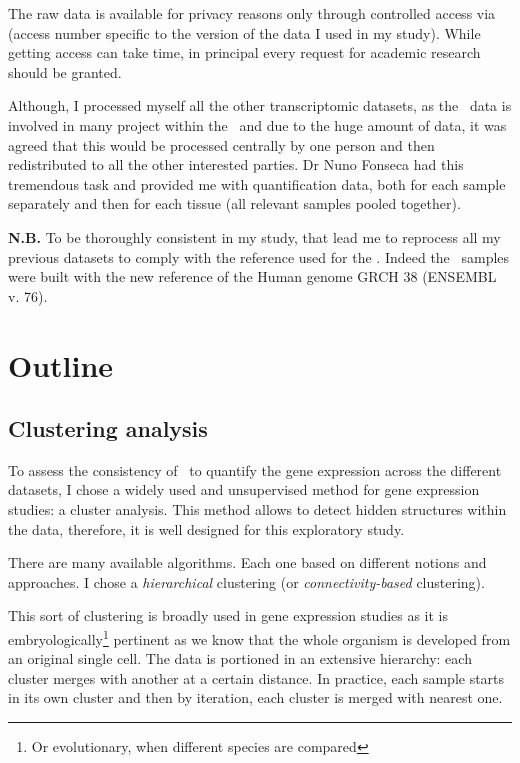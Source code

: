 The raw data is available for privacy reasons only through controlled access via
 (access number specific to the version of the data I used
in my study). While getting access can take time, in principal every request for
academic research should be granted.

Although, I processed myself all the other transcriptomic datasets, as the \Gtex\
data is involved in many project within the \EBI\ and due to the huge amount of data,
it was agreed that this would be processed centrally by one person and then
redistributed to all the other interested parties. Dr Nuno Fonseca had this
tremendous task and provided me with quantification data, both for each sample
separately and then for each tissue (all relevant samples pooled together).

\textbf{N.B. }To be thoroughly consistent in my study, that lead me to reprocess all my
previous datasets to comply with the reference used for the \Gtex. Indeed the
\Gtex\ samples were built with the new reference of the Human genome GRCH 38
(ENSEMBL v. 76).

\section{Outline}

\subsection{Clustering analysis}

To assess the consistency of \Rnaseq\ to quantify the gene expression across
the different datasets, I chose a widely used and unsupervised method for gene
expression studies: a cluster analysis. This method allows to detect hidden
structures within the data, therefore, it is well designed for this exploratory
study.

There are many available algorithms. Each one based on different notions and
approaches. I chose a \emph{hierarchical} clustering
(or \emph{connectivity-based} clustering).

This sort of clustering is broadly used in gene expression studies as it is
embryologically\footnote{Or evolutionary, when different species are compared}
pertinent as we know that the whole organism is developed from
an original single cell. The data is portioned in an extensive hierarchy:
each cluster merges with another at a certain distance.
In practice, each sample starts in its own cluster and then
by iteration, each cluster is merged with nearest one.

